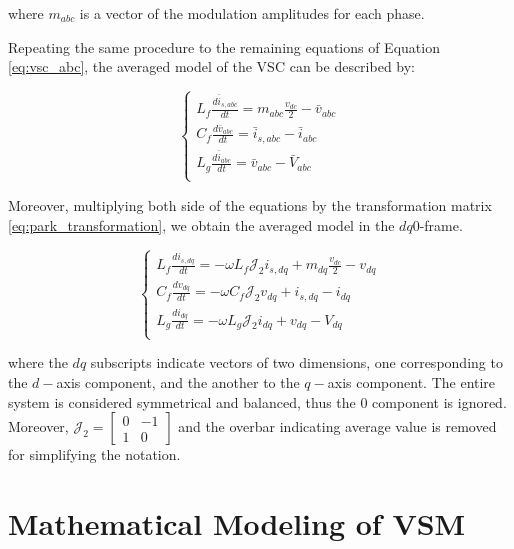 \noindent where $m_{abc}$ is a vector of the modulation amplitudes for each
phase.

Repeating the same procedure to the remaining equations of Equation
\ref{eq:vsc_abc}, the averaged model of the VSC can be described by:

\begin{equation}
    \begin{cases}
       L_f \frac{d\bar{i}_{s,abc}}{dt} = m_{abc}\frac{v_{dc}}{2} - \bar{v}_{abc}\\
       C_f \frac{d\bar{v}_{abc}}{dt} = \bar{i}_{s,abc} - \bar{i}_{abc}\\
       L_g \frac{d\bar{i}_{abc}}{dt} = \bar{v}_{abc} - \bar{V}_{abc}\\
    \end{cases}
    \label{eq:vsc_averaged_abc}
\end{equation}

Moreover, multiplying both side of the equations by the transformation matrix
\ref{eq:park_transformation}, we obtain the averaged model in the $dq0$-frame.

\begin{equation}
    \begin{cases}
       L_f \frac{di_{s,dq}}{dt} = -\omega L_f \mathcal{J}_2 i_{s,dq} + m_{dq}\frac{v_{dc}}{2} - v_{dq}\\
       C_f \frac{dv_{dq}}{dt} = -\omega C_f \mathcal{J}_2 v_{dq} + i_{s,dq} - i_{dq}\\
       L_g \frac{di_{dq}}{dt} = -\omega L_g \mathcal{J}_2 i_{dq} + v_{dq} - V_{dq}\\
    \end{cases}
    \label{eq:vsc_averaged_dq}
\end{equation}

\noindent where the $dq$ subscripts indicate vectors of two dimensions, one
corresponding to the $d-$axis component, and the another to the $q-$axis
component. The entire system is considered symmetrical and balanced, thus the
$0$ component is ignored. Moreover, $\mathcal{J}_2 = \begin{bmatrix}0 & -1\\ 1 &
0\end{bmatrix}$ and the overbar indicating average value is removed for
simplifying the notation.

\section{Mathematical Modeling of VSM} \label{sec:modeling_vsm}

